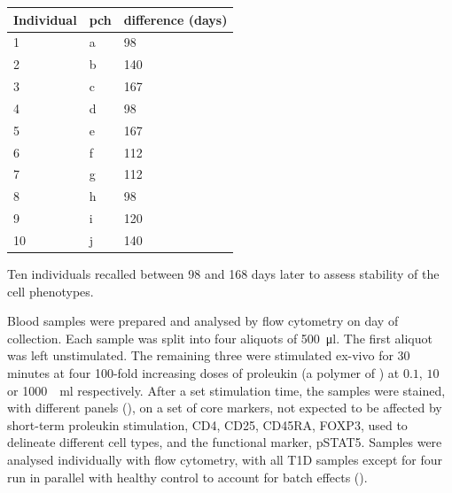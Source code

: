 \begin{table}[ht]
\centering
\begin{tabular}{lll}
  \hline
Individual &  pch & difference (days) \\
  \hline
1        &  a   & 98 \\
2        &  b   & 140 \\
3        &  c   & 167 \\
4        &  d   & 98 \\
5        &  e   & 167 \\
6        &  f   & 112 \\
7        &  g   & 112 \\
8        &  h   & 98 \\
9        &  i   & 120 \\
10       &  j   & 140 \\
   \hline
\end{tabular}
{Ten individuals recalled between 98 and 168 days later to assess stability of the cell phenotypes. }
{
}
\end{table}
Blood samples were prepared and analysed by flow cytometry on day of collection.
Each sample was split into four aliquots of \SI{500}{\micro\litre}.
The first aliquot was left unstimulated.
The remaining three were stimulated ex-vivo for 30 minutes at four 100-fold increasing doses
of proleukin (a polymer of ) at $0.1$, $10$ or \SI{1000}{\unit\per\milli\litre} respectively.
After a set stimulation time, the samples were stained, with different panels (), 
on a set of core markers, not expected to be affected by short-term proleukin stimulation,
CD4, CD25, CD45RA, FOXP3,
used to delineate different cell types, and the functional marker, pSTAT5.
Samples were analysed individually with flow cytometry, with all \gls{T1D} samples except for four run in parallel with healthy control
to account for batch effects ().

